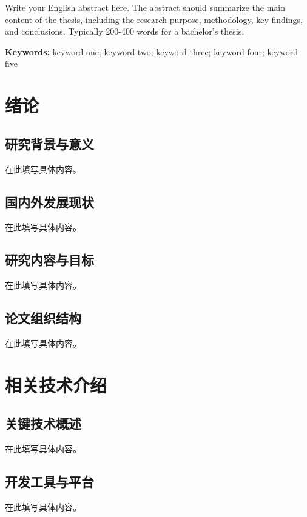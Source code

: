 \documentclass[a4paper,12pt,oneside]{ctexart}
\begin{document}
Write your English abstract here. The abstract should summarize the main content of the thesis, including the research purpose, methodology, key findings, and conclusions. Typically 200-400 words for a bachelor's thesis.

\vspace{1cm}
\noindent\textbf{Keywords:} keyword one; keyword two; keyword three; keyword four; keyword five

\newpage
\tableofcontents


\newpage


\section{绪论}
\subsection{研究背景与意义}
在此填写具体内容。

\subsection{国内外发展现状}
在此填写具体内容。

\subsection{研究内容与目标}
在此填写具体内容。

\subsection{论文组织结构}
在此填写具体内容。


\section{相关技术介绍}
\subsection{关键技术概述}
在此填写具体内容。

\subsection{开发工具与平台}
在此填写具体内容。
\end{document}
